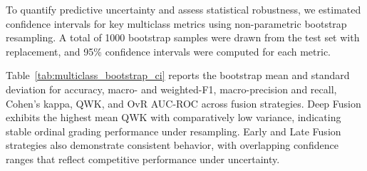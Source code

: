 \documentclass[preprint,12pt]{elsarticle}
\begin{document}
To quantify predictive uncertainty and assess statistical robustness, we estimated confidence intervals for key multiclass metrics using non-parametric bootstrap resampling. A total of 1000 bootstrap samples were drawn from the test set with replacement, and 95\% confidence intervals were computed for each metric.

Table~\ref{tab:multiclass_bootstrap_ci} reports the bootstrap mean and standard deviation for accuracy, macro- and weighted-F1, macro-precision and recall, Cohen’s kappa, QWK, and OvR AUC-ROC across fusion strategies. Deep Fusion exhibits the highest mean QWK with comparatively low variance, indicating stable ordinal grading performance under resampling. Early and Late Fusion strategies also demonstrate consistent behavior, with overlapping confidence ranges that reflect competitive performance under uncertainty.
\end{document}
